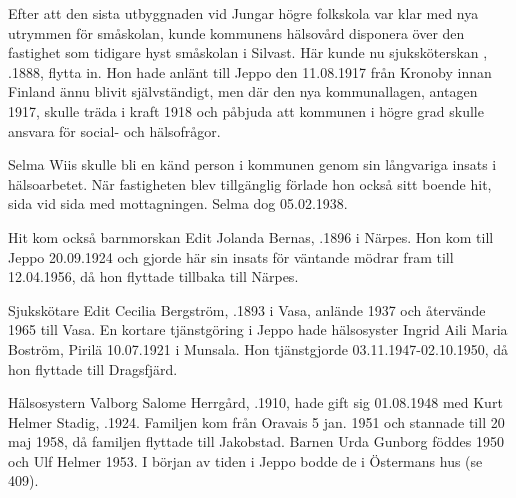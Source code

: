 Efter att den sista utbyggnaden vid Jungar högre folkskola var klar med nya utrymmen för småskolan, kunde kommunens hälsovård disponera över den fastighet som tidigare hyst småskolan i Silvast. Här kunde nu sjuksköterskan , .1888, flytta in. Hon hade anlänt till Jeppo den 11.08.1917 från Kronoby innan Finland ännu blivit självständigt, men där den nya kommunallagen, antagen 1917, skulle träda i kraft 1918 och påbjuda att kommunen i högre grad skulle ansvara för social- och hälsofrågor.

Selma Wiis skulle bli en känd person i kommunen genom sin långvariga insats i hälsoarbetet. När fastigheten blev tillgänglig förlade hon också sitt boende hit, sida vid sida med mottagningen. Selma dog 05.02.1938.

Hit kom också barnmorskan Edit Jolanda Bernas, .1896 i Närpes. Hon kom till Jeppo 20.09.1924 och gjorde här sin insats för väntande mödrar fram till 12.04.1956, då hon flyttade tillbaka till Närpes.

Sjukskötare Edit Cecilia Bergström, .1893 i Vasa, anlände 1937 och återvände 1965 till Vasa. En kortare tjänstgöring i Jeppo hade hälsosyster Ingrid Aili Maria Boström, \textborn Pirilä 10.07.1921 i Munsala. Hon tjänstgjorde 03.11.1947-02.10.1950, då hon flyttade till Dragsfjärd.

Hälsosystern Valborg Salome Herrgård, .1910, hade gift sig 01.08.1948 med Kurt Helmer Stadig, .1924. Familjen kom  från Oravais 5 jan. 1951 och stannade till 20 maj 1958, då familjen flyttade till Jakobstad. Barnen Urda Gunborg föddes 1950 och Ulf Helmer 1953. I början av tiden i Jeppo bodde de i Östermans hus (se 409).
